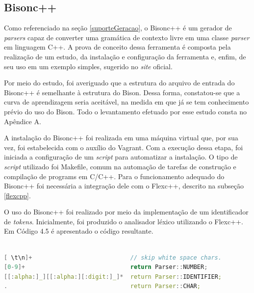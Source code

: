 \subsection{Bisonc++}
Como referenciado na seção \ref{suporteGeracao}, o Bisonc++ é um gerador de
\textit{parsers} capaz de converter uma gramática de contexto livre em uma classe
\textit{parser} em linguagem C++. A prova de conceito dessa ferramenta é
composta pela realização de um estudo, da instalação e configuração da
ferramenta e, enfim, de seu uso em um exemplo simples, sugerido no
\textit{site} oficial.
\par
\indent Por meio do estudo, foi averiguado que a estrutura do arquivo de entrada
do Bisonc++ é semelhante à estrutura do Bison. Dessa forma, constatou-se que a
curva de aprendizagem seria aceitável, na medida em que já se tem conhecimento
prévio do uso do Bison. Todo o levantamento efetuado por esse estudo consta no
Apêndice A.
\par
\indent A instalação do Bisonc++ foi realizada em uma máquina virtual que, por
sua vez, foi estabelecida com o auxílio do Vagrant. Com a execução dessa etapa,
foi iniciada a configuração de um \textit{script} para automatizar a instalação.
O tipo de \textit{script} utilizado foi Makefile, comum na automação de tarefas
de construção e compilação de programs em C/C++. Para o funcionamento adequado
do Bisonc++ foi necessária a integração dele com o Flexc++, descrito na
subseção \ref{flexcpp}.
\par
\indent O uso do Bisonc++ foi realizado por meio da implementação de um
identificador de \textit{tokens}. Inicialmente, foi produzido o analisador
léxico utilizando o Flexc++. Em Código 4.5 é apresentado o código resultante.

\begin{lstlisting}[language=C++, label=analisadorLexicoPCB, caption=Analisador Léxico da Prova de Conceito do Bisonc++]
%%

[ \t\n]+                            // skip white space chars.
[0-9]+                              return Parser::NUMBER;
[[:alpha:]_][[:alpha:][:digit:]_]*  return Parser::IDENTIFIER;
.                                   return Parser::CHAR;
\end{lstlisting}

